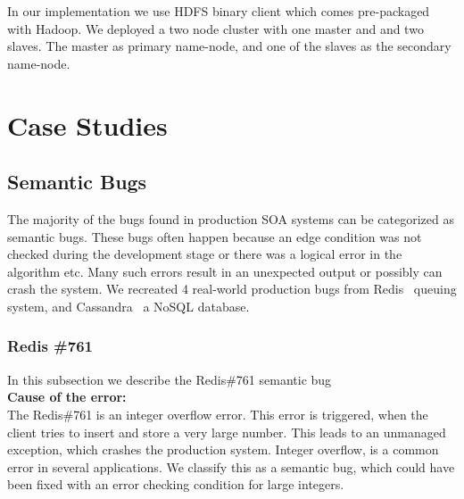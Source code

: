 In our implementation we use HDFS binary client which comes pre-packaged with Hadoop.
We deployed a two node cluster with one master and and two slaves.
The master as primary name-node, and one of the slaves as the secondary name-node.

\section{Case Studies}
\label{sec:parikshanCasestudy}




\subsection{Semantic Bugs}
The majority of the bugs found in production SOA systems can be categorized as semantic bugs.
These bugs often happen because an edge condition was not checked during the development stage or there was a logical error in the algorithm etc.
Many such errors result in an unexpected output or possibly can crash the system.
We recreated 4 real-world production bugs from Redis~\cite{redis} queuing system, and Cassandra~\cite{cassandra} a NoSQL database.


\subsubsection{Redis \#761}

In this subsection we describe the Redis\#761 semantic bug \\

\noindent \textbf{Cause of the error:}\\


\noindent The Redis\#761 is an integer overflow error. 
This error is triggered, when the client tries to insert and store a very large number. 
This leads to an unmanaged exception, which crashes the production system. 
Integer overflow, is a common error in several applications. 
We classify this as a semantic bug, which could have been fixed with an error checking condition for large integers. \\


